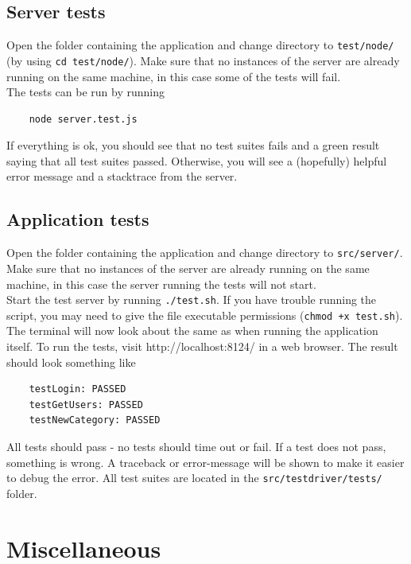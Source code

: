 \documentclass[a4paper, 12pt, titlepage]{article}
\begin{document}
	\subsection{Server tests}
	Open the folder containing the application and change directory to \lstinline{test/node/} (by using \lstinline{cd test/node/}). Make sure that no instances of the server are already running on the same machine, in this case some of the tests will fail.\\

	The tests can be run by running

	\begin{lstlisting}
	node server.test.js
	\end{lstlisting}

	If everything is ok, you should see that no test suites fails and a green result saying that all test suites passed. Otherwise, you will see a (hopefully) helpful error message and a stacktrace from the server.

	\subsection{Application tests}
	Open the folder containing the application and change directory to \lstinline{src/server/}. Make sure that no instances of the server are already running on the same machine, in this case the server running the tests will not start.\\

	Start the test server by running \lstinline{./test.sh}. If you have trouble running the script, you may need to give the file executable permissions (\lstinline{chmod +x test.sh}).\\

	The terminal will now look about the same as when running the application itself. To run the tests, visit http://localhost:8124/ in a web browser. The result should look something like

	\begin{lstlisting}
	testLogin: PASSED
	testGetUsers: PASSED
	testNewCategory: PASSED
	\end{lstlisting}

	All tests should pass - no tests should time out or fail. If a test does not pass, something is wrong. A traceback or error-message will be shown to make it easier to debug the error. All test suites are located in the \lstinline{src/testdriver/tests/} folder. 

	\section{Miscellaneous}
\end{document}

